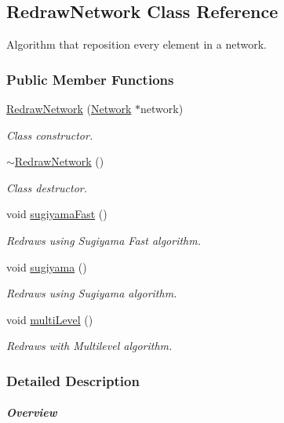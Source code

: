 \hypertarget{class_redraw_network}{}\subsection{Redraw\+Network Class Reference}
\label{class_redraw_network}


Algorithm that reposition every element in a network.  


\subsubsection*{Public Member Functions}
\begin{DoxyCompactItemize}
\item 
\hyperlink{group___algorithms_ga1fe3edb8c57780eb62f7de8f03dfeda3}{Redraw\+Network} (\hyperlink{class_network}{Network} $\ast$network)
\begin{DoxyCompactList}\small\item\em Class constructor. \end{DoxyCompactList}\item 
\hyperlink{group___algorithms_gac7b5f7fdb2b88e7d8bb580834e93b1e8}{$\sim$\+Redraw\+Network} ()
\begin{DoxyCompactList}\small\item\em Class destructor. \end{DoxyCompactList}\item 
void \hyperlink{group___algorithms_ga94d53ddf8ee00c4ef6d56bb988333103}{sugiyama\+Fast} ()
\begin{DoxyCompactList}\small\item\em Redraws using Sugiyama Fast algorithm. \end{DoxyCompactList}\item 
void \hyperlink{group___algorithms_gaee0ae606982145e66bba825421d610f8}{sugiyama} ()
\begin{DoxyCompactList}\small\item\em Redraws using Sugiyama algorithm. \end{DoxyCompactList}\item 
void \hyperlink{group___algorithms_ga56a92ad06ae0198ee60160aa66aa0ce1}{multi\+Level} ()
\begin{DoxyCompactList}\small\item\em Redraws with Multilevel algorithm. \end{DoxyCompactList}\end{DoxyCompactItemize}


\subsubsection{Detailed Description}
\subparagraph*{Overview}

